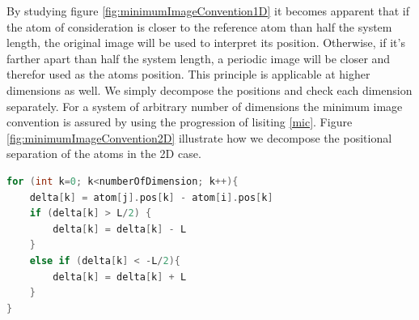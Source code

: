 \documentclass[twoside,english]{uiofysmaster}
\begin{document}
By studying figure \ref{fig:minimumImageConvention1D} it becomes apparent that if the atom of consideration is closer to the reference atom than half the system length, the original image will be used to interpret its position. 
Otherwise, if it's farther apart than half the system length, a periodic image will be closer and therefor used as the atoms position.  
This principle is applicable at higher dimensions as well. We simply decompose the positions and check each dimension separately. For a system of arbitrary number of dimensions the minimum image convention is assured by using the progression of lisiting \ref{mic}. 
Figure \ref{fig:minimumImageConvention2D} illustrate how we decompose the positional separation of the atoms in the 2D case.

\begin{lstlisting}[caption={Loop to compute the position of the closest periodic image of atom $j$ with respect to the referance atom $i$.}, label={mic}, language=c++]
for (int k=0; k<numberOfDimension; k++){
	delta[k] = atom[j].pos[k] - atom[i].pos[k]
	if (delta[k] > L/2) {
		delta[k] = delta[k] - L
	}
	else if (delta[k] < -L/2){
		delta[k] = delta[k] + L
	}
}
\end{lstlisting}

\begin{figure}[H]
\end{figure}

\begin{figure}[H]
\end{figure}
\end{document}
